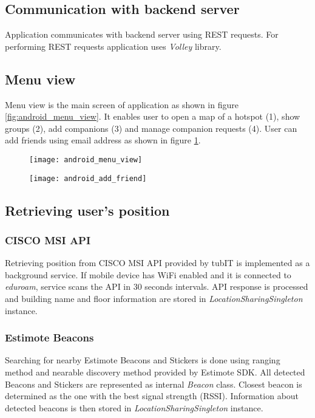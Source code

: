 \subsection{Communication with backend server}
Application communicates with backend server using REST requests. For performing REST requests application uses \textit{Volley} library.

\subsection{Menu view}
Menu view is the main screen of application as shown in figure \ref{fig:android_menu_view}. It enables user to open a map of a hotspot (1), show groups (2), add companions (3) and manage companion requests (4). User can add friends using email address as shown in figure \ref{fig:android_add_friend}.

\begin{figure}
\centering
\begin{minipage}{.5\textwidth}
  \centering
  \texttt{[image: android\_menu\_view]}
  \label{fig:android_menu_view}
\end{minipage}%
\begin{minipage}{.5\textwidth}
  \centering
  \texttt{[image: android\_add\_friend]}
  \label{fig:android_add_friend}
\end{minipage}
\end{figure}

\subsection{Retrieving user's position}
\subsubsection{CISCO MSI API}
Retrieving position from CISCO MSI API provided by tubIT is implemented as a background service. If mobile device has WiFi enabled and it is connected to \textit{eduroam}, service scans the API in 30 seconds intervals. API response is processed and building name and floor information are stored in \textit{LocationSharingSingleton} instance.

\subsubsection{Estimote Beacons}
Searching for nearby Estimote Beacons and Stickers is done using ranging method and nearable discovery method provided by Estimote SDK. All detected Beacons and Stickers are represented as internal \textit{Beacon} class. Closest beacon is determined as the one with the best signal strength (RSSI). Information about detected beacons is then stored in \textit{LocationSharingSingleton} instance.

